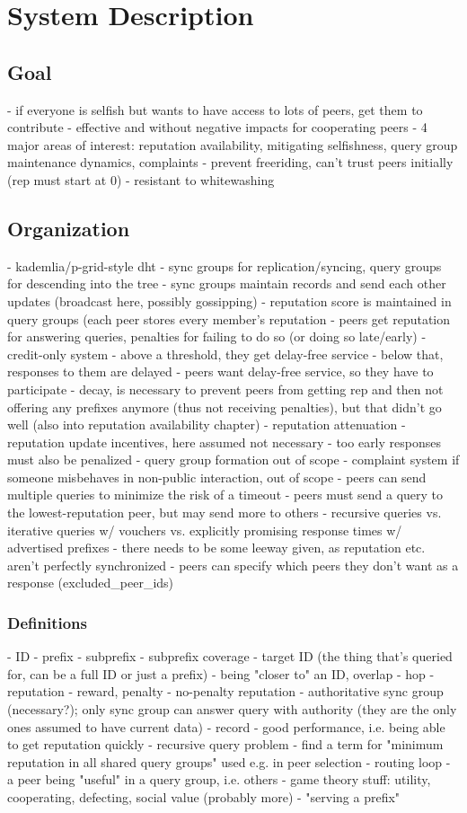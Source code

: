 \chapter{System Description}
\section{Goal}
- if everyone is selfish but wants to have access to lots of peers, get them to
  contribute
- effective and without negative impacts for cooperating peers
- 4 major areas of interest: reputation availability, mitigating selfishness,
  query group maintenance dynamics, complaints
- prevent freeriding, can't trust peers initially (rep must start at 0)
- resistant to whitewashing

\section{Organization}
- kademlia/p-grid-style dht
- sync groups for replication/syncing, query groups for descending into the tree
- sync groups maintain records and send each other updates (broadcast here,
  possibly gossipping)
- reputation score is maintained in query groups (each peer stores every
  member's reputation
- peers get reputation for answering queries, penalties for failing to do so (or
  doing so late/early)
- credit-only system
- above a threshold, they get delay-free service
- below that, responses to them are delayed
- peers want delay-free service, so they have to participate
- decay, is necessary to prevent peers from getting rep and then not offering
  any prefixes anymore (thus not receiving penalties), but that didn't go well
  (also into reputation availability chapter)
- reputation attenuation
- reputation update incentives, here assumed not necessary
- too early responses must also be penalized
- query group formation out of scope
- complaint system if someone misbehaves in non-public interaction, out of scope
- peers can send multiple queries to minimize the risk of a timeout
- peers must send a query to the lowest-reputation peer, but may send more to
  others
- recursive queries vs. iterative queries w/ vouchers vs. explicitly promising
  response times w/ advertised prefixes
- there needs to be some leeway given, as reputation etc. aren't perfectly
  synchronized
- peers can specify which peers they don't want as a response
  (excluded\_peer\_ids)
\subsection{Definitions}
- ID
- prefix
- subprefix
- subprefix coverage
- target ID (the thing that's queried for, can be a full ID or just a prefix)
- being "closer to" an ID, overlap
- hop
- reputation
- reward, penalty
- no-penalty reputation
- authoritative sync group (necessary?); only sync group can answer query with
  authority (they are the only ones assumed to have current data)
- record
- good performance, i.e. being able to get reputation quickly
- recursive query problem
- find a term for "minimum reputation in all shared query groups" used e.g. in
  peer selection
- routing loop
- a peer being "useful" in a query group, i.e. others
- game theory stuff: utility, cooperating, defecting, social value (probably
  more)
- "serving a prefix"
